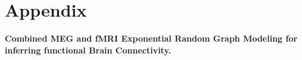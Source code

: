 \clearpage
\pagestyle{plain} %
\hypertarget{app:draft}{} 
\chapter*{\centering Appendix}
\centering \textbf{Combined MEG and fMRI Exponential Random Graph Modeling for inferring functional Brain Connectivity.}
\pagebreak
